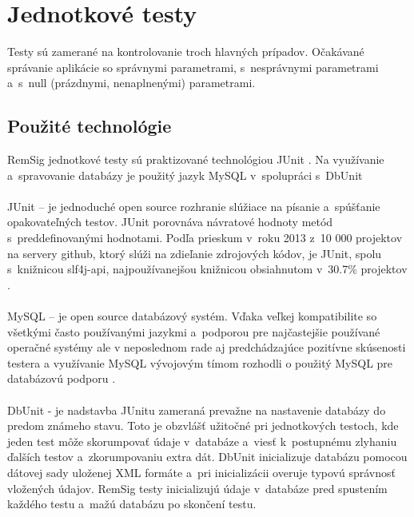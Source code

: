 \documentclass[
  digital, %
  table,   %
oneside,
  nolof,     %
  nolot,     %
]{fithesis3}
\begin{document}
\section{Jednotkové testy}
Testy sú zamerané na kontrolovanie troch hlavných prípadov. Očakávané správanie aplikácie so správnymi parametrami, s~nesprávnymi parametrami a~s~null (prázdnymi, nenaplnenými) parametrami.
\subsection{Použité technológie}
RemSig jednotkové testy sú praktizované technológiou  JUnit \cite{junit}. Na využívanie a~spravovanie databázy je použitý jazyk MySQL v~spolupráci s~DbUnit \cite{dbunit}\paragraph{}
JUnit – je jednoduché open source rozhranie slúžiace na písanie a~spúšťanie opakovateľných testov. JUnit porovnáva návratové hodnoty metód s~preddefinovanými hodnotami. Podľa prieskum v~roku 2013 z~10 000 projektov na servery github, ktorý slúži na zdieľanie zdrojových kódov, je JUnit, spolu s~knižnicou slf4j-api, najpoužívanejšou knižnicou obsiahnutom v~30.7\% projektov \cite{gitHubAnalysis}. \paragraph{}
MySQL – je open source databázový systém. Vďaka veľkej kompatibilite so všetkými často používanými jazykmi a~podporou pre najčastejšie používané operačné systémy ale v neposlednom rade aj predchádzajúce pozitívne skúsenosti testera a využívanie MySQL vývojovým tímom rozhodli o použitý MySQL pre databázovú podporu \cite{mySqlBible}.\paragraph{}
DbUnit -  je nadstavba JUnitu zameraná prevažne na nastavenie databázy do predom známeho stavu. Toto je obzvlášť užitočné pri jednotkových testoch, kde jeden test môže skorumpovať údaje v~databáze a~viesť k~postupnému zlyhaniu ďalších  testov a~zkorumpovaniu extra dát. DbUnit inicializuje databázu pomocou  dátovej sady uloženej XML formáte a~pri inicializácii overuje typovú správnosť vložených údajov. RemSig testy inicializujú údaje v~databáze pred  spustením  každého testu a~mažú databázu po skončení testu.  
\end{document}
